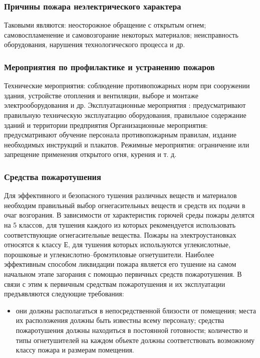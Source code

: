 \subsubsection{Причины пожара неэлектрического характера}
Таковыми  являются: неосторожное обращение с открытым огнем; 
самовоспламенение и самовозгорание некоторых материалов; неисправность
оборудования, нарушения технологического процесса и др.


\subsubsection{Мероприятия по профилактике  и устранению пожаров}
Технические мероприятия: соблюдение противопожарных норм при сооружении
здания, устройстве отопления и вентиляции, выборе и монтаже электрооборудования и др.
Эксплуатационные мероприятия : предусматривают правильную техническую
эксплуатацию оборудования, правильное содержание зданий и территории предприятия
Организационные мероприятия: предусматривают обучение персонала противопожарным правилам,
издание необходимых инструкций и плакатов. Режимные мероприятия: ограничение или запрещение
применения открытого огня, курения и т. д.



\subsubsection{Средства пожаротушения}
Для эффективного и безопасного тушения различных веществ и материалов
необходим правильный выбор огнегасительных веществ и средств их подачи
в очаг возгорания. В зависимости от характеристик горючей среды пожары
делятся на 5 классов, для тушения каждого из которых рекомендуется использовать
соответствующие огнегасительные вещества. Пожары на электроустановках относятся к классу Е,
для тушения которых используются углекислотные, порошковые и углекислотно--бромэтиловые огнетушители.
Наиболее эффективным способом ликвидации пожара является его тушение на самом начальном этапе
загорания с помощью первичных средств пожаротушения.  В связи с этим к первичным средствам
пожаротушения  и их эксплуатации предъявляются следующие требования: 
\begin{itemize}
	\item{} они должны располагаться в непосредственной близости от помещения;
места их расположения должны быть известны всему персоналу; средства
пожаротушения должны находиться в постоянной готовности; количество и типы огнетушителей на каждом объекте должны соответствовать возможному
классу пожара и размерам помещения.
\end{itemize}

